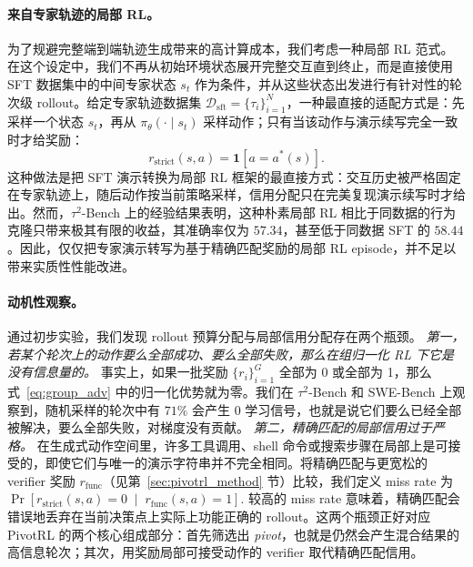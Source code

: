 \paragraph{来自专家轨迹的局部 RL。}
为了规避完整端到端轨迹生成带来的高计算成本，我们考虑一种局部 RL 范式。在这个设定中，我们不再从初始环境状态展开完整交互直到终止，而是直接使用 SFT 数据集中的中间专家状态 $s_t$ 作为条件，并从这些状态出发进行有针对性的轮次级 rollout。给定专家轨迹数据集 $\mathcal{D}_{\mathrm{sft}}=\{\tau_i\}_{i=1}^N$，一种最直接的适配方式是：先采样一个状态 $s_t$，再从 $\pi_{\theta}(\cdot \mid s_t)$ 采样动作；只有当该动作与演示续写完全一致时才给奖励：
\begin{equation}
r_{\mathrm{strict}}(s,a)=\mathbf{1}[a=a^*(s)].
\label{eq:strict_reward}
\end{equation}
这种做法是把 SFT 演示转换为局部 RL 框架的最直接方式：交互历史被严格固定在专家轨迹上，随后动作按当前策略采样，信用分配只在完美复现演示续写时才给出。然而，$\tau^2$-Bench 上的经验结果表明，这种朴素局部 RL 相比于同数据的行为克隆只带来极其有限的收益，其准确率仅为 $57.34$，甚至低于同数据 SFT 的 $58.44$。因此，仅仅把专家演示转写为基于精确匹配奖励的局部 RL episode，并不足以带来实质性性能改进。

\paragraph{动机性观察。}
通过初步实验，我们发现 rollout 预算分配与局部信用分配存在两个瓶颈。 \emph{第一，若某个轮次上的动作要么全部成功、要么全部失败，那么在组归一化 RL 下它是没有信息量的。} 事实上，如果一批奖励 $\{r_i\}_{i=1}^G$ 全部为 0 或全部为 1，那么式~\eqref{eq:group_adv} 中的归一化优势就为零。我们在 $\tau^2$-Bench 和 SWE-Bench 上观察到，随机采样的轮次中有 $71\%$ 会产生 $0$ 学习信号，也就是说它们要么已经全部被解决，要么全部失败，对梯度没有贡献。 \emph{第二，精确匹配的局部信用过于严格。} 在生成式动作空间里，许多工具调用、shell 命令或搜索步骤在局部上是可接受的，即使它们与唯一的演示字符串并不完全相同。将精确匹配与更宽松的 verifier 奖励 $r_{\mathrm{func}}$（见第~\ref{sec:pivotrl_method} 节）比较，我们定义 miss rate 为 $\Pr\!\left[
r_{\mathrm{strict}}(s,a)=0
\;\middle|\;
r_{\mathrm{func}}(s,a)=1
\right].$
较高的 miss rate 意味着，精确匹配会错误地丢弃在当前决策点上实际上功能正确的 rollout。这两个瓶颈正好对应 PivotRL 的两个核心组成部分：首先筛选出 \emph{pivot}，也就是仍然会产生混合结果的高信息轮次；其次，用奖励局部可接受动作的 verifier 取代精确匹配信用。

